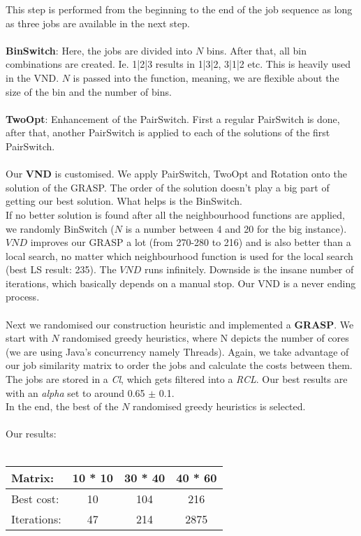 \documentclass[12pt]{article}
\begin{document}
This step is performed from the beginning to the end of the job sequence as long as
three jobs are available in the next step.
\\
\\
\textbf{BinSwitch}: Here, the jobs are divided into $N$ bins. After that, all bin combinations are created. Ie. 1|2|3 results in 1|3|2, 3|1|2 etc. This is heavily used in the VND. $N$ is passed into the function, meaning, we are flexible about the size of the bin and the number of bins.
\\
\\
\textbf{TwoOpt}: Enhancement of the PairSwitch. First a regular PairSwitch is done, after that, another PairSwitch is applied to each of the solutions of the first PairSwitch.
\\
\\
Our \textbf{VND} is customised. We apply PairSwitch, TwoOpt and Rotation onto the solution of the GRASP. The order of the solution doesn't play a big part of getting our best solution. What helps is the BinSwitch. 
\\
If no better solution is found after all the neighbourhood functions are applied, we randomly BinSwitch ($N$ is a number between 4 and 20 for the big instance). $VND$ improves our GRASP a lot (from 270-280 to 216) and is also better than a local search, no matter which neighbourhood function is used for the local search (best LS result: 235). The $VND$ runs infinitely. Downside is the insane number of iterations, which basically depends on a manual stop. Our VND is a never ending process.
\\
\\
Next we randomised our construction heuristic and implemented a \textbf{GRASP}. We start with $N$ randomised greedy heuristics, where N 
depicts the number of cores (we are using Java's concurrency namely Threads). Again, we take advantage of our job similarity matrix to order the jobs and calculate the costs between them. The jobs are stored in a \textit{Cl}, which gets filtered into a \textit{RCL}. Our best results are with an \textit{alpha} set to around 0.65 $\pm$ 0.1.
\\
In the end, the best of the $N$ randomised greedy heuristics is selected.
\\
\\
Our results:\\
\\
\center
\begin{tabular}{ | l | c | c | c |}
  \hline
  Matrix: 	& 10 * 10 & 30 * 40 & 40 * 60 \\ \hline
  Best cost:	& 10    & 104   & 216 \\ \hline
  Iterations: 	& 47	& 214 	& 2875 \\ \hline
\end{tabular}
\end{document}
